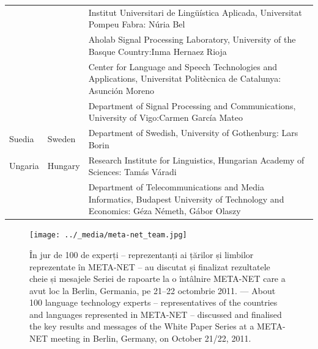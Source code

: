 \begin{longtable}{@{}llp{113mm}@{}}
  & & Institut Universitari de Lingüística Aplicada, Universitat Pompeu Fabra: Núria Bel \\ \addlinespace 
  & & Aholab Signal Processing Laboratory, University of the Basque Country:\newline Inma Hernaez Rioja \\ \addlinespace 
  & & Center for Language and Speech Technologies and Applications, Universitat Politècnica de Catalunya:  Asunción Moreno \\ \addlinespace 
  & & Department of Signal Processing and Communications, University of Vigo:\newline Carmen García Mateo \\ \addlinespace 
  Suedia & \textcolor{grey1}{Sweden} & Department of Swedish, University of Gothenburg: Lars Borin \\ \addlinespace 
  Ungaria & \textcolor{grey1}{Hungary} & Research Institute for Linguistics, Hungarian Academy of Sciences: Tamás Váradi\\  \addlinespace
  & & Department of Telecommunications and Media Informatics, Budapest University of Technology and Economics: Géza Németh, Gábor Olaszy
\end{longtable}
\normalsize

\renewcommand*{\figureformat}{}
\renewcommand*{\captionformat}{}

\begin{figure}[htbp]
  \center
  \texttt{[image: ../\_media/meta-net\_team.jpg]}
  \caption{În jur de 100 de experți -- reprezentanți ai țărilor și limbilor reprezentate în META-NET -- au discutat și finalizat rezultatele cheie și mesajele Seriei de rapoarte la o întâlnire META-NET care a avut loc la Berlin, Germania, pe 21--22 octombrie 2011. --- \textcolor{grey1}{About 100 language technology experts -- representatives of the countries and languages represented in META-NET -- discussed and finalised the key results and messages of the White Paper Series at a META-NET meeting in Berlin, Germany, on October 21/22, 2011.}}
\end{figure}

\cleardoublepage

\label{whitepaperseries}

